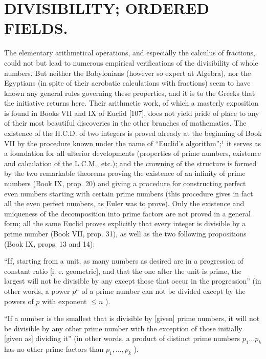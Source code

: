 \chapter{DIVISIBILITY; ORDERED FIELDS.}

The elementary arithmetical operations, and especially the calculus of fractions, could not but lead to numerous empirical verifications of the divisibility of whole numbers. But neither the Babylonians (however so expert at Algebra), nor the Egyptians (in spite of their acrobatic calculations with fractions) seem to have known any general rules governing these properties, and it is to the Greeks that the initiative returns here. Their arithmetic work, of which a masterly exposition is found in Books VII and IX of Euclid {[}107{]}, does not yield pride of place to any of their most beautiful discoveries in the other branches of mathematics. The existence of the H.C.D. of two integers is proved already at the beginning of Book VII by the procedure known under the name of ``Euclid's algorithm'';¹ it serves as a foundation for all ulterior developments (properties of prime numbers, existence and calculation of the L.C.M., etc.); and the crowning of the structure is formed by the two remarkable theorems proving the existence of an infinity of prime numbers (Book IX, prop. 20) and giving a procedure for constructing perfect even numbers starting with certain prime numbers (this procedure gives in fact all the even perfect numbers, as Euler was to prove). Only the existence and uniqueness of the decomposition into prime factors are not proved in a general form; all the same Euclid proves explicitly that every integer is divisible by a prime number (Book VII, prop. 31), as well as the two following propositions (Book IX, props. 13 and 14):

``If, starting from a unit, as many numbers as desired are in a progression of constant ratio {[}i. e. geometric{]}, and that the one after the unit is prime, the largest will not be divisible by any except those that occur in the progression'' (in other words, a power \(p^n\) of a prime number can not be divided except by the powers of \(p\) with exponent \(\leq n\) ).

``If a number is the smallest that is divisible by {[}given{]} prime numbers, it will not be divisible by any other prime number with the exception of those initially {[}given as{]} dividing it'' (in other words, a product of distinct prime numbers \(p_1 \ldots p_k\) has no other prime factors than \(p_1, \ldots, p_k\) ).

